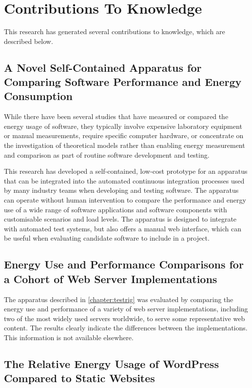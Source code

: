 \section{Contributions To Knowledge}
\label{section:contributions}

This research has generated several contributions to knowledge, which are described below.

\subsection{A Novel Self-Contained Apparatus for Comparing Software Performance and Energy Consumption}
\label{contrib:apparatus}

While there have been several studies that have measured or compared the energy usage of software, they typically involve expensive laboratory equipment or manual measurements, require specific computer hardware, or concentrate on the investigation of theoretical models rather than enabling energy measurement and comparison as part of routine software development and testing.

This research has developed a self-contained, low-cost prototype for an apparatus that can be integrated into the automated \gls{continuous integration} processes used by many industry teams when developing and testing software. The apparatus can operate without human intervention to compare the performance and energy use of a wide range of software applications and software components with customisable scenarios and load levels. The apparatus is designed to integrate with automated test systems, but also offers a manual web interface, which can be useful when evaluating candidate software to include in a project.

\subsection{Energy Use and Performance Comparisons for a Cohort of Web Server Implementations}
\label{contrib:servers}

The apparatus described in \autoref{chapter:testrig} was evaluated by comparing the energy use and performance of a variety of web server implementations, including two of the most widely used servers worldwide, to serve some representative web content. The results clearly indicate the differences between the implementations. This information is not available elsewhere.

\subsection{The Relative Energy Usage of WordPress Compared to Static Websites}
\label{contrib:wordpress}

